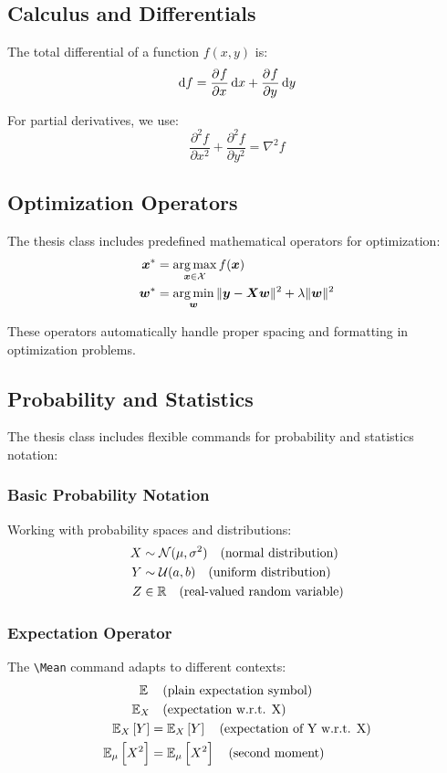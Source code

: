 \documentclass[english]{thesis-uoc}
\begin{document}
\subsection{Calculus and Differentials}
%
The total differential of a function $f(x,y)$ is:
%
\begin{equation}
\dif f = \dpd{f}{x} \dif x + \dpd{f}{y} \dif y
\end{equation}

For partial derivatives, we use:
%
\begin{equation}
\frac{\partial^2 f}{\partial x^2} + \frac{\partial^2 f}{\partial y^2} = \nabla^2 f
\end{equation}

\subsection{Optimization Operators}

The thesis class includes predefined mathematical operators for optimization:
%
\begin{align}
\bm{x}^* &= \operatorname*{arg\,max}_{\bm{x} \in \mathcal{X}} f(\bm{x}) \\
\bm{w}^* &= \operatorname*{arg\,min}_{\bm{w}} \| \bm{y} - \bm{Xw} \|^2 + \lambda \| \bm{w} \|^2
\end{align}

These operators automatically handle proper spacing and formatting in optimization problems.

\subsection{Probability and Statistics}

The thesis class includes flexible commands for probability and statistics notation:

\subsubsection{Basic Probability Notation}
Working with probability spaces and distributions:
%
\begin{align}
X &\sim \mathcal{N}(\mu, \sigma^2) \quad \text{(normal distribution)} \\
Y &\sim \mathcal{U}(a, b) \quad \text{(uniform distribution)} \\
Z &\in \mathbb{R} \quad \text{(real-valued random variable)}
\end{align}

\subsubsection{Expectation Operator}
The \verb|\Mean| command adapts to different contexts:
%
\begin{align}
\Mean &\quad \text{(plain expectation symbol)} \\
\Mean[X] &\quad \text{(expectation w.r.t. X)} \\
\Mean[X][Y] &= \mathbb{E}_X \left[ Y \right] \quad \text{(expectation of Y w.r.t. X)} \\
\Mean[\mu][X^2] &= \mathbb{E}_\mu \left[ X^2 \right] \quad \text{(second moment)}
\end{align}
\end{document}

